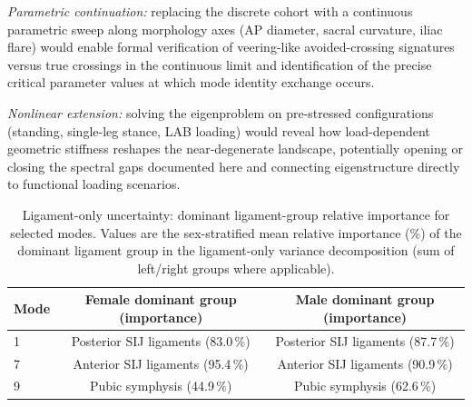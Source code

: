 \documentclass[11pt]{article}
\newcommand{\StdTableFont}{\footnotesize}
\begin{document}
\emph{Parametric continuation:} replacing the discrete cohort with a continuous parametric sweep along morphology axes (AP diameter, sacral curvature, iliac flare) would enable formal verification of veering-like avoided-crossing signatures versus true crossings in the continuous limit and identification of the precise critical parameter values at which mode identity exchange occurs.

\emph{Nonlinear extension:} solving the eigenproblem on pre-stressed configurations (standing, single-leg stance, LAB loading) would reveal how load-dependent geometric stiffness reshapes the near-degenerate landscape, potentially opening or closing the spectral gaps documented here and connecting eigenstructure directly to functional loading scenarios.





\begin{table}[!tbp]
\centering
\caption{Ligament-only uncertainty: dominant ligament-group relative importance for selected modes.
Values are the sex-stratified mean relative importance (\%) of the dominant ligament group in the ligament-only variance decomposition (sum of left/right groups where applicable).}
\label{tab:ligament-dominance}
\StdTableFont
\begin{tabular}{lcc}
\toprule
Mode & Female dominant group (importance) & Male dominant group (importance) \\
\midrule
1 & Posterior SIJ ligaments (83.0\,\%) & Posterior SIJ ligaments (87.7\,\%) \\
7 & Anterior SIJ ligaments (95.4\,\%) & Anterior SIJ ligaments (90.9\,\%) \\
9 & Pubic symphysis (44.9\,\%) & Pubic symphysis (62.6\,\%) \\
\bottomrule
\end{tabular}
\end{table}
\end{document}
